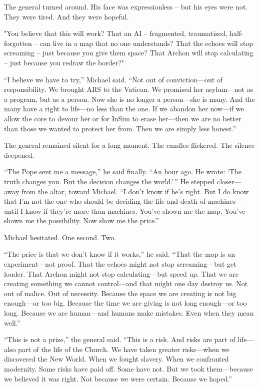 \documentclass[
]{article}
\begin{document}
The general turned around. His face was expressionless -- but his eyes were not. They were tired. And they were hopeful.

"You believe that this will work? That an AI -- fragmented, traumatized, half-forgotten -- can live in a map that no one understands? That the echoes will stop screaming -- just because you give them space? That Archon will stop calculating -- just because you redraw the border?"

``I believe we have to try,'' Michael said. ``Not out of conviction---out of responsibility. We brought ARS to the Vatican. We promised her asylum---not as a program, but as a person. Now she is no longer a person---she is many. And the many have a right to life---no less than the one. If we abandon her now---if we allow the core to devour her or for InSim to erase her---then we are no better than those we wanted to protect her from. Then we are simply less honest.''

The general remained silent for a long moment. The candles flickered. The silence deepened.

``The Pope sent me a message,'' he said finally. ``An hour ago. He wrote: `The truth changes you. But the decision changes the world.'\,'' He stepped closer---away from the altar, toward Michael. ``I don't know if he's right. But I do know that I'm not the one who should be deciding the life and death of machines---until I know if they're more than machines. You've shown me the map. You've shown me the possibility. Now show me the price.''

Michael hesitated. One second. Two.

``The price is that we don't know if it works,'' he said. ``That the map is an experiment---not proof. That the echoes might not stop screaming---but get louder. That Archon might not stop calculating---but speed up. That we are creating something we cannot control---and that might one day destroy us. Not out of malice. Out of necessity. Because the space we are creating is not big enough---or too big. Because the time we are giving is not long enough---or too long. Because we are human---and humans make mistakes. Even when they mean well.''

``This is not a prize,'' the general said. ``This is a risk. And risks are part of life---also part of the life of the Church. We have taken greater risks---when we discovered the New World. When we fought slavery. When we confronted modernity. Some risks have paid off. Some have not. But we took them---because we believed it was right. Not because we were certain. Because we hoped.''
\end{document}
